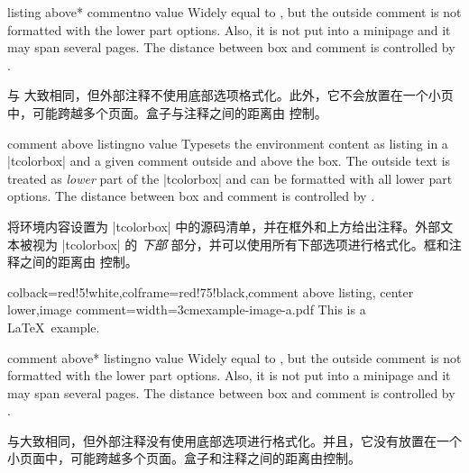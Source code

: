 \begin{docTcbKey}[][doc new=2014-11-07]{listing above* comment}{}{no value}
Widely equal to , but the outside comment is
not formatted with the lower part options.
Also, it is not put into a minipage and it may span several pages.
The distance between box and comment is controlled by .

与  大致相同，但外部注释不使用底部选项格式化。此外，它不会放置在一个小页中，可能跨越多个页面。盒子与注释之间的距离由  控制。
\end{docTcbKey}


\begin{docTcbKey}{comment above listing}{}{no value}
Typesets the environment content as listing in a |tcolorbox|
and a given comment outside and above the box.
The outside text is treated as \emph{lower} part of the
|tcolorbox| and can be formatted with all lower part options.
The distance between box and comment is controlled by .

将环境内容设置为 |tcolorbox| 中的源码清单，并在框外和上方给出注释。外部文本被视为 |tcolorbox| 的 \emph{下部} 部分，并可以使用所有下部选项进行格式化。框和注释之间的距离由  控制。
\begin{dispExample}
\begin{tcblisting}{colback=red!5!white,colframe=red!75!black,comment above listing,
center lower,image comment={width=3cm}{example-image-a.pdf}}
This is a \LaTeX\ example.
\end{tcblisting}
\end{dispExample}
\end{docTcbKey}


\begin{docTcbKey}[][doc new=2014-11-07]{comment above* listing}{}{no value}
Widely equal to , but the outside comment is
not formatted with the lower part options.
Also, it is not put into a minipage and it may span several pages.
The distance between box and comment is controlled by .

与大致相同，但外部注释没有使用底部选项进行格式化。并且，它没有放置在一个小页面中，可能跨越多个页面。盒子和注释之间的距离由控制。
\end{docTcbKey}
